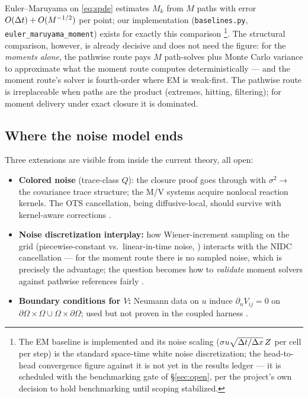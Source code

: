 Euler--Maruyama on \eqref{eq:spde} estimates $M_k$ from $M$ paths with error
$O(\Delta t) + O(M^{-1/2})$ per point; our implementation (\texttt{baselines.py},
\texttt{euler\_maruyama\_moment}) exists for exactly this comparison
\tagS\footnote{The EM baseline is implemented and its noise scaling
($\sigma u\sqrt{\Delta t/\Delta x}\,Z$ per cell per step) is the standard space-time white
noise discretization; the head-to-head convergence figure against it is not yet
in the results ledger --- it is scheduled with the benchmarking gate of
\S\ref{sec:open}, per the project's own decision to hold benchmarking until
scoping stabilized.}. The structural comparison, however, is already decisive
and does not need the figure: for the \emph{moments alone}, the pathwise route
pays $M$ path-solves plus Monte Carlo variance to approximate what the moment
route computes deterministically --- and the moment route's solver is
fourth-order where EM is weak-first. The pathwise route is irreplaceable when
paths are the product (extremes, hitting, filtering); for moment delivery under
exact closure it is dominated.

\subsection{Where the noise model ends}

Three extensions are visible from inside the current theory, all open:
\begin{itemize}
\item \textbf{Colored noise} (trace-class $Q$): the closure proof goes through
with $\sigma^2 \to$ the covariance trace structure; the M/V systems acquire
nonlocal reaction kernels. The OTS cancellation, being diffusive-local, should
survive with kernel-aware corrections \tagO.
\item \textbf{Noise discretization interplay:} how Wiener-increment sampling on
the grid (piecewise-constant vs.\ linear-in-time noise,
\citep{petersson2022}) interacts with the NIDC cancellation --- for the moment
route there is no sampled noise, which is precisely the advantage; the question
becomes how to \emph{validate} moment solvers against pathwise references
fairly \tagO.
\item \textbf{Boundary conditions for $V$:} Neumann data on $u$ induce
$\partial_n V_{ij}=0$ on $\partial\Omega\times\Omega \cup \Omega\times
\partial\Omega$; used but not proven in the coupled harness \tagO.
\end{itemize}

